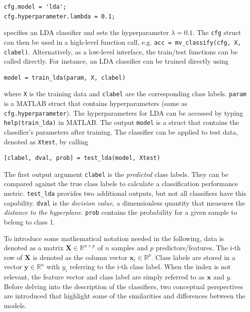 \documentclass[utf8]{frontiersSCNS} %
\newcommand{\x}{\mathbf{x}}
\newcommand{\R}{\mathbb{R}}
\newcommand{\X}{\mathbf{X}}
\newcommand{\ttt}[1]{\texttt{#1}}
\begin{document}
\begin{verbatim}
cfg.model = 'lda';
cfg.hyperparameter.lambda = 0.1;
\end{verbatim}

specifies an LDA classifier and sets the hyperparameter $\lambda = 0.1$. The \ttt{cfg} struct can then be used in a high-level function call, e.g. \ttt{acc = mv\_classify(cfg, X, clabel)}.
Alternatively, as a low-level interface, the train/test functions can be called directly. For instance, an LDA classifier can be trained directly using

\begin{verbatim}
model = train_lda(param, X, clabel)
\end{verbatim}

where \ttt{X} is the training data and \ttt{clabel} are the corresponding class labels. \ttt{param} is a MATLAB struct that contains hyperparameters (same as \ttt{cfg.hyperparameter}). The hyperparameters for LDA can be accessed by typing \ttt{help(train\_lda)} in MATLAB.
The output \ttt{model} is a struct that contains the classifier's parameters after training. The classifier can be applied to test data, denoted as \ttt{Xtest}, by calling

\begin{verbatim}
[clabel, dval, prob] = test_lda(model, Xtest)
\end{verbatim}

The first output argument \ttt{clabel} is the \textit{predicted} class labels. They can be compared against the true class labels to calculate a classification performance metric. \ttt{test\_lda} provides two additional outputs, but not all classifiers have this capability. \ttt{dval} is the \textit{decision value}, a dimensionless quantity that measures the \textit{distance to the hyperplane}. \ttt{prob} contains the probability for a given sample to belong to class 1.

To introduce some mathematical notation needed in the following, data is denoted as a matrix $\X\in\R^{n \times p}$ of $n$ samples and $p$ predictors/features. The i-th row of $\X$ is denoted as the column vector $\x_i\in\R^p$. Class labels are stored in a vector $\mathbf{y}\in\R^n$ with $y_i$ referring to the i-th class label. When the index is not relevant, the feature vector and class label are simply referred to as $\x$ and $y$. Before delving into the description of the classifiers, two conceptual perspectives are introduced that highlight some of the similarities and differences between the models.
\end{document}
